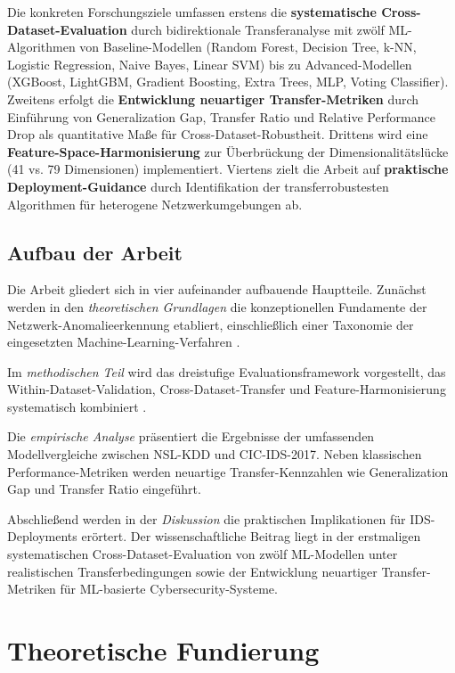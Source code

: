 \documentclass[11pt,a4paper]{article}
\begin{document}
    Die konkreten Forschungsziele umfassen erstens die \textbf{systematische Cross-Dataset-Evaluation} durch bidirektionale Transferanalyse mit zwölf ML-Algorithmen von Baseline-Modellen (Random Forest, Decision Tree, k-NN, Logistic Regression, Naive Bayes, Linear SVM) bis zu Advanced-Modellen (XGBoost, LightGBM, Gradient Boosting, Extra Trees, MLP, Voting Classifier). Zweitens erfolgt die \textbf{Entwicklung neuartiger Transfer-Metriken} durch Einführung von Generalization Gap, Transfer Ratio und Relative Performance Drop als quantitative Maße für Cross-Dataset-Robustheit. Drittens wird eine \textbf{Feature-Space-Harmonisierung} zur Überbrückung der Dimensionalitätslücke (41 vs. 79 Dimensionen) implementiert. Viertens zielt die Arbeit auf \textbf{praktische Deployment-Guidance} durch Identifikation der transferrobustesten Algorithmen für heterogene Netzwerkumgebungen ab.



    \subsection{Aufbau der Arbeit}

    Die Arbeit gliedert sich in vier aufeinander aufbauende Hauptteile. Zunächst werden in den \textit{theoretischen Grundlagen} die konzeptionellen Fundamente der Netzwerk-Anomalieerkennung etabliert, einschließlich einer Taxonomie der eingesetzten Machine-Learning-Verfahren \parencite{McHugh2000,Vinayakumar2019}.

    Im \textit{methodischen Teil} wird das dreistufige Evaluationsframework vorgestellt, das Within-Dataset-Validation, Cross-Dataset-Transfer und Feature-Harmonisierung systematisch kombiniert \parencite{Gharib2016}.

    Die \textit{empirische Analyse} präsentiert die Ergebnisse der umfassenden Modellvergleiche zwischen NSL-KDD und CIC-IDS-2017. Neben klassischen Performance-Metriken werden neuartige Transfer-Kennzahlen wie Generalization Gap und Transfer Ratio eingeführt.

    Abschließend werden in der \textit{Diskussion} die praktischen Implikationen für IDS-Deployments erörtert. Der wissenschaftliche Beitrag liegt in der erstmaligen systematischen Cross-Dataset-Evaluation von zwölf ML-Modellen unter realistischen Transferbedingungen sowie der Entwicklung neuartiger Transfer-Metriken für ML-basierte Cybersecurity-Systeme.


    \section{Theoretische Fundierung}
\end{document}
